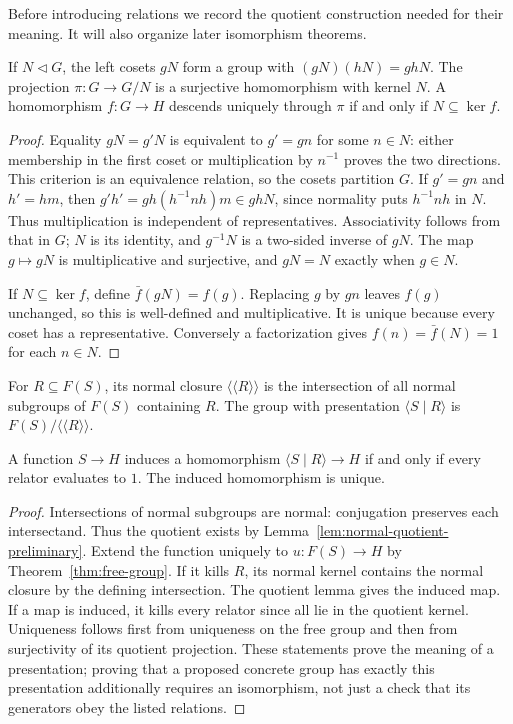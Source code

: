 Before introducing relations we record the quotient construction needed for their meaning. It will also organize later isomorphism theorems.
\begin{lemma}\label{lem:normal-quotient-preliminary}
If $N\mathrel{\triangleleft}G$, the left cosets $gN$ form a group with $(gN)(hN)=ghN$. The projection $\pi:G\to G/N$ is a surjective homomorphism with kernel $N$. A homomorphism $f:G\to H$ descends uniquely through $\pi$ if and only if $N\subseteq\ker f$.
\end{lemma}
\begin{proof}
Equality $gN=g'N$ is equivalent to $g'=gn$ for some $n\in N$: either membership in the first coset or multiplication by $n^{-1}$ proves the two directions. This criterion is an equivalence relation, so the cosets partition $G$. If $g'=gn$ and $h'=hm$, then $g'h'=gh(h^{-1}nh)m\in ghN$, since normality puts $h^{-1}nh$ in $N$. Thus multiplication is independent of representatives. Associativity follows from that in $G$; $N$ is its identity, and $g^{-1}N$ is a two-sided inverse of $gN$. The map $g\mapsto gN$ is multiplicative and surjective, and $gN=N$ exactly when $g\in N$.

If $N\subseteq\ker f$, define $\bar f(gN)=f(g)$. Replacing $g$ by $gn$ leaves $f(g)$ unchanged, so this is well-defined and multiplicative. It is unique because every coset has a representative. Conversely a factorization gives $f(n)=\bar f(N)=1$ for each $n\in N$.
\end{proof}

\begin{definition}
For $R\subseteq F(S)$, its normal closure $\langle\!\langle R\rangle\!\rangle$ is the intersection of all normal subgroups of $F(S)$ containing $R$. The group with presentation $\langle S\mid R\rangle$ is $F(S)/\langle\!\langle R\rangle\!\rangle$.
\end{definition}
\begin{proposition}\label{prop:presentation-universal}
A function $S\to H$ induces a homomorphism $\langle S\mid R\rangle\to H$ if and only if every relator evaluates to $1$. The induced homomorphism is unique.
\end{proposition}
\begin{proof}
Intersections of normal subgroups are normal: conjugation preserves each intersectand. Thus the quotient exists by Lemma~\ref{lem:normal-quotient-preliminary}. Extend the function uniquely to $u:F(S)\to H$ by Theorem~\ref{thm:free-group}. If it kills $R$, its normal kernel contains the normal closure by the defining intersection. The quotient lemma gives the induced map. If a map is induced, it kills every relator since all lie in the quotient kernel. Uniqueness follows first from uniqueness on the free group and then from surjectivity of its quotient projection. These statements prove the meaning of a presentation; proving that a proposed concrete group has exactly this presentation additionally requires an isomorphism, not just a check that its generators obey the listed relations.
\end{proof}

